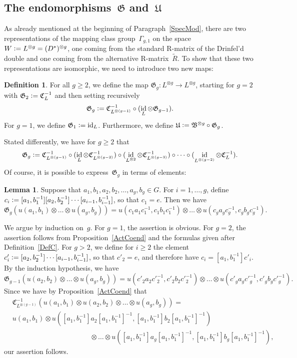 \documentclass[12pt]{article}
\makeatletter
\theoremstyle{definition}
\newtheorem{Lemma}[Satz]{Lemma}
\newtheorem{Definition}[Satz]{Definition}
\theoremstyle{break}
\renewenvironment{proof}[1][\proofname]{\par
\vspace{-5pt}%
\pushQED{\qed}%
\normalfont
\topsep0pt \partopsep0pt %
\trivlist
\item[\hskip\labelsep
\bfseries
#1\@addpunct{.}]\ignorespaces
}{%
\popQED\endtrivlist\@endpefalse
\addvspace{6pt plus 6pt} %
}
\DeclareMathOperator\id{id}
\newcommand{\fB}{\mathfrak{B}}
\newcommand{\fC}{\mathfrak{C}}
\newcommand{\fG}{\mathfrak{G}}
\newcommand{\fU}{\mathfrak{U}}
\renewcommand{\1}{\mathbbm{1}}
\newcommand{\ot}{\mathbin{\otimes}}
\newcommand{\uu}{u}
\newcommand{\deq}{\vcentcolon =}
\makeatother
\begin{document}
\subsection{The endomorphisms~$\fG$ and~$\fU$} \label{EndomGU}
As already mentioned at the beginning of Paragraph~\ref{SpecMod}, there are two representations of the mapping class group~$\Gamma_{g,1}$ on the
space~$W \deq L^{\ot g} = (D^*)^{\ot g}$, one coming from the standard R-matrix of the Drinfel'd double and one coming from the alternative R-matrix~$\tilde{R}$. To show that these two representations are isomorphic, we need to introduce two new maps:
\begin{Definition} \label{DefGU}
For all $g \ge 2$, we define the map $\fG_g \colon L^{\ot g} \to L^{\ot g}$, starting for $g=2$ with $\fG_2 \deq \fC_L^{-1}$ and then setting recursively
\[\fG_g \deq \fC_{L^{\ot (g-1)}}^{-1} \circ (\id_L \ot \fG_{g-1}).\]
For $g=1$, we define $\fG_1 \deq \id_L$.
Furthermore, we define $\fU \deq \fB^{\ot g} \circ \fG_g$.
\end{Definition}
Stated differently, we have for $g \ge 2$ that
\[\fG_g \deq \fC_{L^{\ot (g-1)}}^{-1} \circ (\id_L \ot \fC_{L^{\ot (g-2)}}^{-1})
\circ (\id_{L^{\ot 2}} \ot \fC_{L^{\ot (g-3)}}^{-1})
\circ \cdots \circ (\id_{L^{\ot (g-2)}} \ot \fC_{L}^{-1}).\]
Of course, it is possible to express~$\fG_g$ in terms of elements:
\begin{Lemma}
Suppose that $a_1,b_1,a_2,b_2, \ldots, a_g,b_g \in G$. For $i=1,\dots,g$, define
$c_i \deq [a_1,b_1^{-1}] [a_2,b_2^{-1}] \cdots [a_{i-1},b_{i-1}^{-1}]$, so that $c_1=e$. Then we have
\[\fG_g(\uu(a_1,b_1) \ot \dots \ot \uu(a_g,b_g)) =
\uu(c_1 a_1 c_1^{-1}, c_1 b_1 c_1^{-1}) \ot \dots
\ot \uu(c_g a_g c_g^{-1}, c_g b_g c_g^{-1}).\]
\end{Lemma}
\begin{proof}
We argue by induction on~$g$. For $g=1$, the assertion is obvious. For $g=2$, the assertion follows from Proposition~\ref{ActCoend} and the formulas given after Definition~\ref{DefC}. For $g>2$, we define for $i \ge 2$ the element
$c'_i \deq  [a_2,b_2^{-1}] \cdots [a_{i-1},b_{i-1}^{-1}]$, so that $c'_2=e$, and therefore have $c_i = [a_1,b_1^{-1}] c'_i$. By the induction hypothesis, we have
\[\fG_{g-1}(\uu(a_2,b_2) \ot \dots \ot \uu(a_g,b_g)) =
\uu(c'_2 a_2 c'^{-1}_2, c'_2 b_2 c'^{-1}_2) \ot
\dots \ot \uu(c'_g a_g c'^{-1}_g, c'_g b_g c'^{-1}_g).\]
Since we have by Proposition~\ref{ActCoend} that
\begin{align*}
&\fC_{L^{\ot (g-1)}}^{-1}(\uu(a_1,b_1) \ot \uu(a_2,b_2) \ot \dots \ot \uu(a_g,b_g)) = \\
&\uu(a_1,b_1) \ot \uu([a_1,b_1^{-1}] a_2 [a_1,b_1^{-1}]^{-1}, [a_1,b_1^{-1}] b_2 [a_1,b_1^{-1}]^{-1}) \\
&\mspace{200mu}
\ot \dots \ot \uu([a_1,b_1^{-1}] a_g [a_1,b_1^{-1}]^{-1},[a_1,b_1^{-1}] b_g [a_1,b_1^{-1}]^{-1}),
\end{align*}
our assertion follows.
\end{proof}
\end{document}
